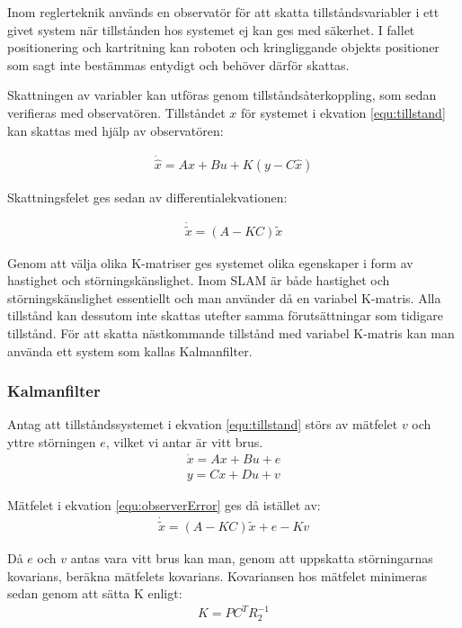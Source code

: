 \documentclass[a4paper,12pt,fleqn]{article}
\begin{document}
Inom reglerteknik används en observatör för att skatta tillståndsvariabler i ett givet system när tillstånden hos systemet ej kan ges med säkerhet. I fallet positionering och kartritning kan roboten och kringliggande objekts positioner som sagt inte bestämmas entydigt och behöver därför skattas. 

Skattningen av variabler kan utföras genom tillståndsåterkoppling, som sedan verifieras med observatören.  Tillståndet $x$ för systemet i ekvation \ref{equ:tillstand} kan skattas med hjälp av observatören: 

\begin{gather}
\dot{\hat{x}} = Ax + Bu + K(y - C\hat{x})
\label{equ:observer}
\end{gather}

Skattningsfelet ges sedan av differentialekvationen: 

\begin{gather}
\dot{\tilde{x}} = (A - KC)\tilde{x}
\label{equ:observerError}
\end{gather}

Genom att välja olika K-matriser ges systemet olika egenskaper i form av hastighet och störningskänslighet. Inom SLAM är både hastighet och störningskänslighet essentiellt och man använder då en variabel K-matris. Alla tillstånd kan dessutom inte skattas utefter samma förutsättningar som tidigare tillstånd. För att skatta nästkommande tillstånd med variabel K-matris kan man använda ett system som kallas Kalmanfilter. 

\subsubsection{Kalmanfilter}

Antag att tillståndssystemet i ekvation \ref{equ:tillstand} störs av mätfelet $v$ och yttre störningen $e$, vilket vi antar är vitt brus.  
\begin{gather}
\dot{x}=Ax+Bu+e \\
y=Cx+Du+v
\end{gather}

Mätfelet i ekvation \ref{equ:observerError} ges då istället av: 
\begin{gather}
\dot{\tilde{x}} = (A - KC)\tilde{x} + e - Kv
\end{gather}

Då $e$ och $v$ antas vara vitt brus kan man, genom att uppskatta störningarnas kovarians, beräkna mätfelets kovarians. Kovariansen hos mätfelet minimeras sedan genom att sätta K enligt: 
\begin{gather}
K = PC^{T}R_{2}^{-1}
\end{gather}
\end{document}
